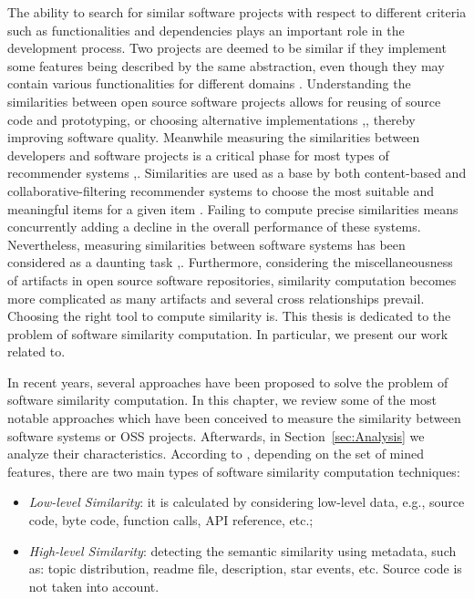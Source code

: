 The ability to search for similar software projects with respect to different criteria such as functionalities and dependencies plays an important role in the development process. Two projects are deemed to be similar if they implement some features being described by the same abstraction, even though they may contain various functionalities for different domains \cite{McMillan:2012:DSS:2337223.2337267}. Understanding the similarities between open source software projects allows for reusing of source code and prototyping, or choosing alternative implementations \cite{Schafer:2007:CFR:1768197.1768208},\cite{10.1109/SANER.2017.7884605}, thereby improving software quality. Meanwhile measuring the similarities between developers and software projects is a critical phase for most types of recommender systems \cite{DBLP:conf/rweb/NoiaO15},\cite{Sarwar:2001:ICF:371920.372071}. Similarities are used as a base by both content-based and collaborative-filtering recommender systems to choose the most suitable and meaningful items for a given item \cite{Schafer:2007:CFR:1768197.1768208}. Failing to compute precise similarities means concurrently adding a decline in the overall performance of these systems. Nevertheless, measuring similarities between software systems has been considered as a daunting task \cite{Chen:2015:SFD:2684822.2685305},\cite{McMillan:2012:DSS:2337223.2337267}. Furthermore, considering the miscellaneousness of artifacts in open source software repositories, similarity computation becomes more complicated as many artifacts and several cross relationships prevail. Choosing the right tool to compute similarity is. This thesis is dedicated to the problem of software similarity computation. In particular, we present our work related to.

In recent years, several approaches have been proposed to solve the problem of software similarity computation. In this chapter, we review some of the most notable approaches which have been conceived to measure the similarity between software systems or OSS projects. Afterwards, in Section~\ref{sec:Analysis} we analyze their characteristics. According to \cite{Chen:2015:SFD:2684822.2685305}, depending on the set of mined features, there are two main types of software similarity computation techniques: 

\begin{itemize}	
	\item \textit{Low-level Similarity}: it is calculated by considering low-level data, e.g., source code, byte code, function calls, API reference, etc.; 
	\item \textit{High-level Similarity}: detecting the semantic similarity using metadata, such as: topic distribution, readme file, description, star events, etc. Source code is not taken into account.	
\end{itemize}

